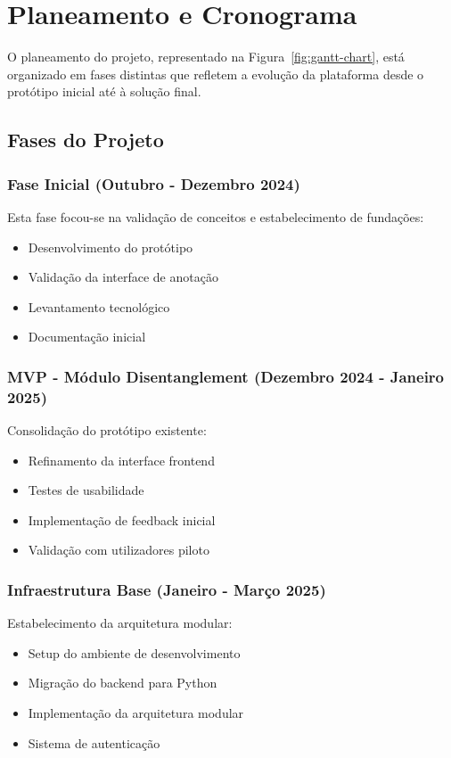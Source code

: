 \section{Planeamento e Cronograma}

O planeamento do projeto, representado na Figura~\ref{fig:gantt-chart}, está organizado em fases distintas que refletem a evolução da plataforma desde o protótipo inicial até à solução final.

\subsection{Fases do Projeto}

\subsubsection{Fase Inicial (Outubro - Dezembro 2024)}
Esta fase focou-se na validação de conceitos e estabelecimento de fundações:
\begin{itemize}
    \item Desenvolvimento do protótipo
    \item Validação da interface de anotação
    \item Levantamento tecnológico
    \item Documentação inicial
\end{itemize}

\subsubsection{MVP - Módulo Disentanglement (Dezembro 2024 - Janeiro 2025)}
Consolidação do protótipo existente:
\begin{itemize}
    \item Refinamento da interface frontend
    \item Testes de usabilidade
    \item Implementação de feedback inicial
    \item Validação com utilizadores piloto
\end{itemize}

\subsubsection{Infraestrutura Base (Janeiro - Março 2025)}
Estabelecimento da arquitetura modular:
\begin{itemize}
    \item Setup do ambiente de desenvolvimento
    \item Migração do backend para Python
    \item Implementação da arquitetura modular
    \item Sistema de autenticação
\end{itemize}

